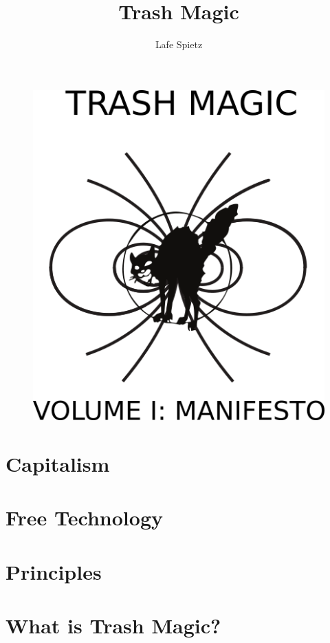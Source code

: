 \documentclass[ebook,12pt,openany]{memoir} %
\title{Trash Magic}
\author{Lafe Spietz}
\begin{document}
\begin{figure}[htbp]
\centering
\includegraphics{images/frontcover.png}
\end{figure}

\clearpage

\maketitle

\tableofcontents

\chapter{Capitalism}


\chapter{Free Technology}


\chapter{Principles}


\chapter{What is Trash Magic?}

\end{document}

